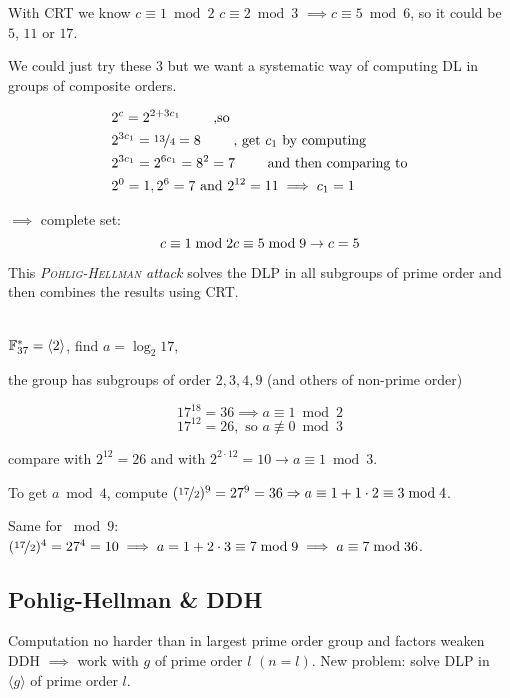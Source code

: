 With \textsc{CRT} we know $c \equiv 1 \bmod 2$ $c \equiv 2 \bmod 3$ $\implies c \equiv 5 \bmod 6$, so it could be $5$, $11$ or $17$.

We could just try these $3$ but we want a systematic way of computing \textsc{DL} in groups of composite orders.

\begin{align*}
&2^c = 2^{2+3 c_1} \qquad \text{ ,so} \\
&2^{3c_1} = \nicefrac{13}{4} = 8 \qquad \text{ , get } c_1 \text{ by computing} \\
&2^{3c_1 } =2^{6c_1} = 8^2 = 7 \qquad \text{ and then comparing to} \\
&2^0 = 1, 2^6 = 7 \text{ and } 2^{12}=11 \implies c_1=1
\end{align*}

$\implies$ complete set:
\[
c \equiv 1 \bmod 2 \\
c \equiv 5 \bmod 9 \\
\rightarrow c = 5
\]

This \emph{\textsc{Pohlig-Hellman} attack} solves the \textsc{DLP} in all subgroups of prime order and then combines the results using \textsc{CRT}.

\begin{example}\ \\
$\mathbb{F}_{37}^{\ast} = \langle 2 \rangle$, find $a = \log_2 17$,

the group has subgroups of order $2,3,4,9$ (and others of non-prime order)

\[
	17^{18} = 36 \implies a \equiv 1 \bmod 2
\]
\[
	17^{12} = 26, \text{ so } a \not\equiv 0 \bmod 3
\]

compare with $2^{12} = 26$ and with $2^{2 \cdot 12} = 10 \rightarrow a \equiv 1 \bmod 3$.

To get $a \bmod 4$, compute $(\nicefrac{17}{2})^9 = 27^9 = 36 \Rightarrow a \equiv 1 + 1 \cdot 2 \equiv 3 \bmod 4$.

Same for $\bmod 9$: $(\nicefrac{17}{2})^4 = 27^4 = 10 \implies a =1+2 \cdot 3 \equiv 7 \bmod 9 \implies a \equiv 7 \bmod 36$.

\end{example}

\subsection{Pohlig-Hellman \& DDH}

Computation no harder than in largest prime order group and factors weaken \textsc{DDH} $\implies$ work with $g$ of prime order $l$ $(n=l)$. New problem: solve \textsc{DLP} in $\langle g \rangle$ of prime order $l$. \\

